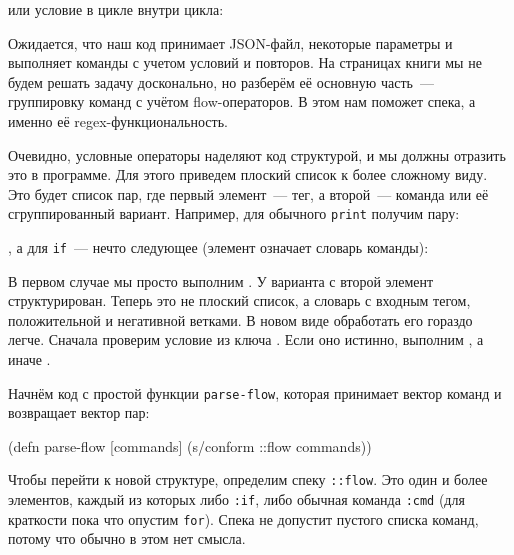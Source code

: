 \noindent
или условие в цикле внутри цикла:


\begin{clojure}
\end{clojure}


Ожидается, что наш код принимает JSON-файл, некоторые параметры и выполняет
команды с учетом условий и повторов. На страницах книги мы не будем решать
задачу досконально, но разберём её основную часть~--- группировку команд с
учётом flow-операторов. В этом нам поможет спека, а именно её
regex-функциональность.


Очевидно, условные операторы наделяют код структурой, и мы должны отразить это в
программе. Для этого приведем плоский список к более сложному виду. Это
будет список пар, где первый элемент~--- тег, а второй~--- команда или её
сгруппированный вариант. Например, для обычного \texttt{print} получим пару:


\begin{clojure}
\end{clojure}


\noindent
, а для \texttt{if}~--- нечто следующее (элемент  означает словарь
команды):


\begin{clojure}
\end{clojure}


В первом случае мы просто выполним . У варианта с  второй
элемент структурирован. Теперь это не плоский список, а словарь с входным тегом,
положительной и негативной ветками. В новом виде обработать его гораздо
легче. Сначала проверим условие из ключа . Если оно истинно,
выполним , а иначе .

Начнём код с простой функции \texttt{parse-flow}, которая принимает вектор
команд и возвращает вектор пар:


\begin{clojure}
(defn parse-flow [commands]
  (s/conform ::flow commands))
\end{clojure}


Чтобы перейти к новой структуре, определим спеку \texttt{::flow}. Это один и
более элементов, каждый из которых либо \texttt{:if}, либо обычная команда
\texttt{:cmd} (для краткости пока что опустим \texttt{for}). Спека не допустит
пустого списка команд, потому что обычно в этом нет смысла.


